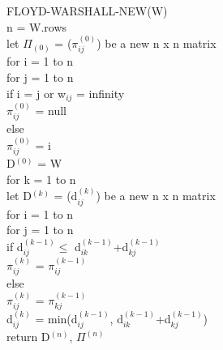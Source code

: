 \documentclass{article}
\begin{document}
FLOYD-WARSHALL-NEW(W) \\
\phantom{ayylmao} n = W.rows \\
\phantom{ayylmao}let $\Pi_{(0)}$ = ($\pi_{ij}^{(0)}$) be a new n x n matrix \\
\phantom{ayylmao}for i = 1 to n \\
\phantom{ayylmao}\phantom{ayy}for j = 1 to n\\
\phantom{ayylmao}\phantom{ayy}\phantom{ayy}if i = j or w$_{ij}$ = infinity\\
\phantom{ayylmao}\phantom{ayy}\phantom{ayy}\phantom{ayy}$\pi_{ij}^{(0)}$ = null\\
\phantom{ayylmao}\phantom{ayy}\phantom{ayy}else\\
\phantom{ayylmao}\phantom{ayy}\phantom{ayy}\phantom{ayy}$\pi_{ij}^{(0)}$ = i\\
\phantom{ayylmao} D$^{(0)}$ = W\\
\phantom{ayylmao} for k = 1 to n \\
\phantom{ayylmao}\phantom{ayy}let D$^{(k)}$ = (d$_{ij}^{(k)}$) be a new n x n matrix\\
\phantom{ayylmao}\phantom{ayy}for i = 1 to n\\
\phantom{ayylmao}\phantom{ayy}\phantom{ayy}for j = 1 to n\\
\phantom{ayylmao}\phantom{ayy}\phantom{ayy}\phantom{ayy} if d$_{ij}^{(k-1)} \leq$  d$_{ik}^{(k-1)}$+d$_{kj}^{(k-1)}$ \\
\phantom{ayylmao}\phantom{ayy}\phantom{ayy}\phantom{ayy}\phantom{ayy}$\pi_{ij}^{(k)}$ = $\pi_{ij}^{(k-1)}$ \\
\phantom{ayylmao}\phantom{ayy}\phantom{ayy}\phantom{ayy}else\\
\phantom{ayylmao}\phantom{ayy}\phantom{ayy}\phantom{ayy}\phantom{ayy} $\pi_{ij}^{(k)}$ = $\pi_{kj}^{(k-1)}$\\
\phantom{ayylmao}\phantom{ayy}\phantom{ayy}\phantom{ayy}	d$_{ij}^{(k)}$ = min(d$_{ij}^{(k-1)}$, d$_{ik}^{(k-1)}$+d$_{kj}^{(k-1)}$)\\
\phantom{ayylmao}return D$^{(n)}$, $\Pi^{(n)}$

	
\end{document}
